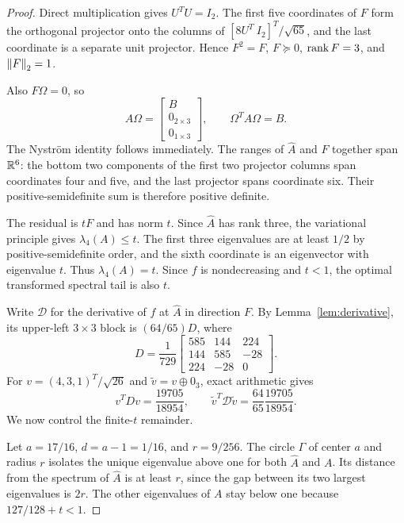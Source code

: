 \documentclass[11pt]{article}
\begin{document}
\begin{proof}
Direct multiplication gives $U^TU=I_2$. The first five coordinates of $F$ form the orthogonal projector onto the columns of $[8U^T\ I_2]^T/\sqrt{65}$, and the last coordinate is a separate unit projector. Hence $F^2=F$, $F\succeq0$, $\operatorname{rank} F=3$, and $\left\lVert F\right\rVert_2=1$.

Also $F\Omega=0$, so
\[
 A\Omega=\begin{bmatrix}B\\0_{2\times3}\\0_{1\times3}\end{bmatrix},
 \qquad \Omega^TA\Omega=B.
\]
The Nystr\"om identity follows immediately. The ranges of $\widehat A$ and $F$ together span $\mathbb R^6$: the bottom two components of the first two projector columns span coordinates four and five, and the last projector spans coordinate six. Their positive-semidefinite sum is therefore positive definite.

The residual is $tF$ and has norm $t$. Since $\widehat A$ has rank three, the variational principle gives $\lambda_4(A)\le t$. The first three eigenvalues are at least $1/2$ by positive-semidefinite order, and the sixth coordinate is an eigenvector with eigenvalue $t$. Thus $\lambda_4(A)=t$. Since $f$ is nondecreasing and $t<1$, the optimal transformed spectral tail is also $t$.

Write $\mathcal D$ for the derivative of $f$ at $\widehat A$ in direction $F$. By Lemma~\ref{lem:derivative}, its upper-left $3\times3$ block is $(64/65)D$, where
\[
 D=\frac1{729}\begin{bmatrix}
 585&144&224\\144&585&-28\\224&-28&0
 \end{bmatrix}.
\]
For $v=(4,3,1)^T/\sqrt{26}$ and $\widetilde v=v\oplus0_3$, exact arithmetic gives
\begin{equation}\label{eq:witness}
 v^TDv=\frac{19705}{18954},\qquad
 \widetilde v^T\mathcal D\widetilde v
   =\frac{64}{65}\frac{19705}{18954}.
\end{equation}
We now control the finite-$t$ remainder.

Let $a=17/16$, $d=a-1=1/16$, and $r=9/256$. The circle $\Gamma$ of center $a$ and radius $r$ isolates the unique eigenvalue above one for both $\widehat A$ and $A$. Its distance from the spectrum of $\widehat A$ is at least $r$, since the gap between its two largest eigenvalues is $2r$. The other eigenvalues of $A$ stay below one because $127/128+t<1$.


\end{proof}
\end{document}
